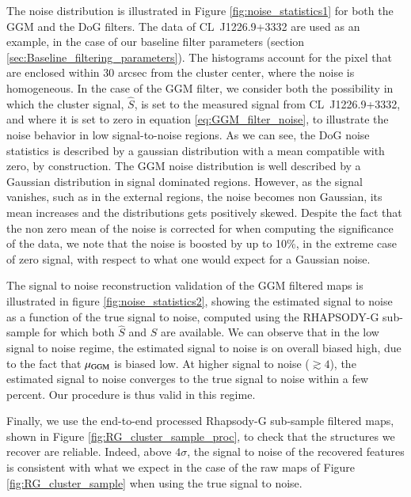 \documentclass[twocolumn,traditabstract]{aa}
\begin{document}
The noise distribution is illustrated in Figure \ref{fig:noise_statistics1} for both the GGM and the DoG filters. The data of \mbox{CL~J1226.9+3332} are used as an example, in the case of our baseline filter parameters (section \ref{sec:Baseline_filtering_parameters}). The histograms account for the pixel that are enclosed within 30 arcsec from the cluster center, where the noise is homogeneous. In the case of the GGM filter, we consider both the possibility in which the cluster signal, $\hat{S}$, is set to the measured signal from \mbox{CL~J1226.9+3332}, and where it is set to zero in equation \ref{eq:GGM_filter_noise}, to illustrate the noise behavior in low signal-to-noise regions. As we can see, the DoG noise statistics is described by a gaussian distribution with a mean compatible with zero, by construction. The GGM noise distribution is well described by a Gaussian distribution in signal dominated regions. However, as the signal vanishes, such as in the external regions, the noise becomes non Gaussian, its mean increases and the distributions gets positively skewed. Despite the fact that the non zero mean of the noise is corrected for when computing the significance of the data, we note that the noise is boosted by up to 10\%, in the extreme case of zero signal, with respect to what one would expect for a Gaussian noise.

The signal to noise reconstruction validation of the GGM filtered maps is illustrated in figure \ref{fig:noise_statistics2}, showing the estimated signal to noise as a function of the true signal to noise, computed using the RHAPSODY-G sub-sample for which both $\hat{S}$ and $S$ are available. We can observe that in the low signal to noise regime, the estimated signal to noise is on overall biased high, due to the fact that $\mu_{\rm GGM}$ is biased low. At higher signal to noise ($\gtrsim 4$), the estimated signal to noise converges to the true signal to noise within a few percent. Our procedure is thus valid in this regime.

Finally, we use the end-to-end processed Rhapsody-G sub-sample filtered maps, shown in Figure \ref{fig:RG_cluster_sample_proc}, to check that the structures we recover are reliable. Indeed, above $4 \sigma$, the signal to noise of the recovered features is consistent with what we expect in the case of the raw maps of Figure \ref{fig:RG_cluster_sample} when using the true signal to noise.

\end{document}
